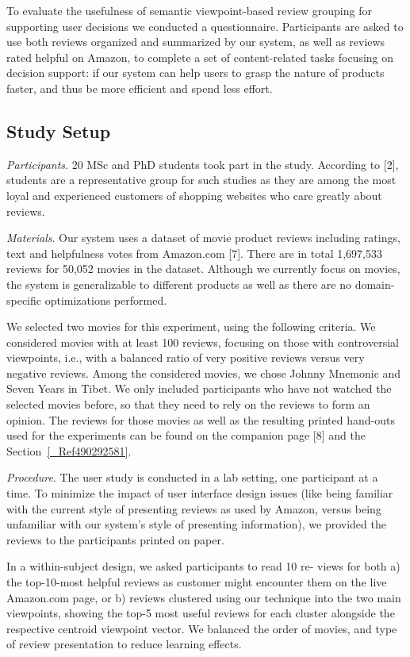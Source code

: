 \documentclass[runningheads,a4paper]{llncs}
\begin{document}
To evaluate the usefulness of semantic viewpoint-based review grouping for supporting user decisions we conducted a questionnaire. Participants are asked to use both reviews organized and summarized by our system, as well as reviews rated helpful on Amazon, to complete a set of content-related tasks focusing on decision support: if our system can help users to grasp the nature of products faster, and thus be more efficient and spend less effort.

\subsection{Study Setup}

{\em Participants}. 20 MSc and PhD students took part in the study. According to [2], students are a representative group for such studies as they are among the most loyal and experienced customers of shopping websites who care greatly about reviews.

{\em Materials}. Our system uses a dataset of movie product reviews including ratings, text and helpfulness votes from Amazon.com [7]. There are in total 1,697,533 reviews for 50,052 movies in the dataset. Although we currently focus on movies, the system is generalizable to different products as well as there are no domain-specific optimizations performed.

We selected two movies for this experiment, using the following criteria. We considered movies with at least 100 reviews, focusing on those with controversial viewpoints, i.e., with a balanced ratio of very positive reviews versus very negative reviews. Among the considered movies, we chose Johnny Mnemonic and Seven Years in Tibet. We only included participants who have not watched the selected movies before, so that they need to rely on the reviews to form an opinion. The reviews for those movies as well as the resulting printed hand-outs used for the experiments can be found on the companion page [8] and the Section~\ref{_Ref490292581}.

{\em Procedure}. The user study is conducted in a lab setting, one participant at a time. To minimize the impact of user interface design issues (like being familiar with the current style of presenting reviews as used by Amazon, versus being unfamiliar with our system's style of presenting information), we provided the reviews to the participants printed on paper.

In a within-subject design, we asked participants to read 10 re- views for both a) the top-10-most helpful reviews as customer might encounter them on the live Amazon.com page, or b) reviews clustered using our technique into the two main viewpoints, showing the top-5 most useful reviews for each cluster alongside the respective centroid viewpoint vector. We balanced the order of movies, and type of review presentation to reduce learning effects.
\end{document}
